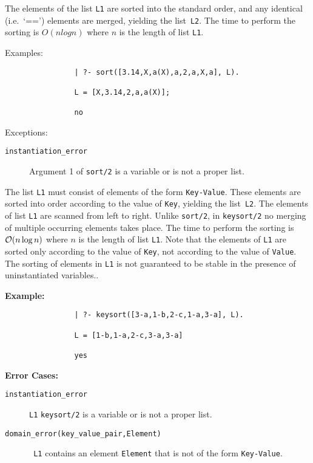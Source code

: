 \begin{description}
    The elements of the list {\tt L1} are sorted into the standard order,
    and any identical (i.e.\ `==') elements are merged, yielding the 
    list~{\tt L2}.  The time to perform the sorting is $O(n log n)$ where 
    $n$ is the length of list {\tt L1}.  

    Examples:
    {\footnotesize
     \begin{verbatim}
                | ?- sort([3.14,X,a(X),a,2,a,X,a], L).

                L = [X,3.14,2,a,a(X)];

                no
     \end{verbatim}}
    Exceptions:
    \begin{description}
    \item[{\tt instantiation\_error}]
	Argument 1 of {\tt sort/2} is a variable or is not a proper list.
    \end{description}

%
The list {\tt L1} must consist of elements of the form
\verb'Key-Value'.  These elements are sorted into order according to
the value of {\tt Key}, yielding the list~{\tt L2}.  The elements of
list {\tt L1} are scanned from left to right.  Unlike {\tt sort/2}, in
{\tt keysort/2} no merging of multiple occurring elements takes place.
The time to perform the sorting is ${\cal O}(n \log n)$ where $n$ is the
length of list {\tt L1}.  Note that the elements of {\tt L1} are
sorted only according to the value of {\tt Key}, not according to the
value of {\tt Value}.  The sorting of elements in {\tt L1} is not
guaranteed to be stable in the presence of uninstantiated variables..

{\bf    Example:}
    {\footnotesize
     \begin{verbatim}
                | ?- keysort([3-a,1-b,2-c,1-a,3-a], L).

                L = [1-b,1-a,2-c,3-a,3-a]

                yes
     \end{verbatim}}
{\bf Error Cases:}
\begin{description} 
\item[{\tt instantiation\_error}]
     {\tt L1} {\tt keysort/2} is a variable or is not a proper
     list.  
\item[{\tt domain\_error(key\_value\_pair,Element)}] {\tt
     L1} contains an element {\tt Element} that is not of the
     form \verb'Key-Value'.  
\end{description}


\end{description}
